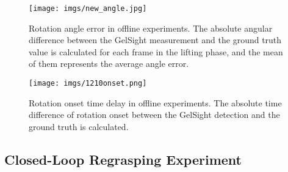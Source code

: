 \begin{figure}[!htbp]
    \centering
    \texttt{[image: imgs/new\_angle.jpg]}
    \caption{Rotation angle error in offline experiments. The absolute angular difference between the GelSight measurement and the ground truth value is calculated for each frame in the lifting phase, and the mean of them represents the average angle error.}
    \label{fig:angle_all}
    \vspace{-4mm}
\end{figure}
\begin{figure}[!htbp]
    \centering
    \texttt{[image: imgs/1210onset.png]}
    \caption{Rotation onset time delay in  offline experiments. The absolute time difference of rotation onset between the GelSight detection and the ground truth is calculated.}
    \label{fig:onset_all}
     \vspace{-2mm}
\end{figure}
\subsection{Closed-Loop Regrasping Experiment}

